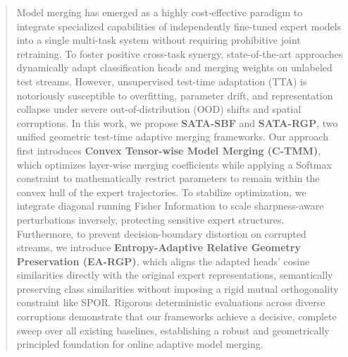 \documentclass{article}
\begin{document}

\printAffiliationsAndNotice{}

\begin{abstract}
Model merging has emerged as a highly cost-effective paradigm to integrate specialized capabilities of independently fine-tuned expert models into a single multi-task system without requiring prohibitive joint retraining. To foster positive cross-task synergy, state-of-the-art approaches dynamically adapt classification heads and merging weights on unlabeled test streams. However, unsupervised test-time adaptation (TTA) is notoriously susceptible to overfitting, parameter drift, and representation collapse under severe out-of-distribution (OOD) shifts and spatial corruptions. In this work, we propose \textbf{SATA-SBF} and \textbf{SATA-RGP}, two unified geometric test-time adaptive merging frameworks. Our approach first introduces \textbf{Convex Tensor-wise Model Merging (C-TMM)}, which optimizes layer-wise merging coefficients while applying a Softmax constraint to mathematically restrict parameters to remain within the convex hull of the expert trajectories. To stabilize optimization, we integrate diagonal running Fisher Information to scale sharpness-aware perturbations inversely, protecting sensitive expert structures. Furthermore, to prevent decision-boundary distortion on corrupted streams, we introduce \textbf{Entropy-Adaptive Relative Geometry Preservation (EA-RGP)}, which aligns the adapted heads' cosine similarities directly with the original expert representations, semantically preserving class similarities without imposing a rigid mutual orthogonality constraint like SPOR. Rigorous deterministic evaluations across diverse corruptions demonstrate that our frameworks achieve a decisive, complete sweep over all existing baselines, establishing a robust and geometrically principled foundation for online adaptive model merging.
\end{abstract}
\end{document}
